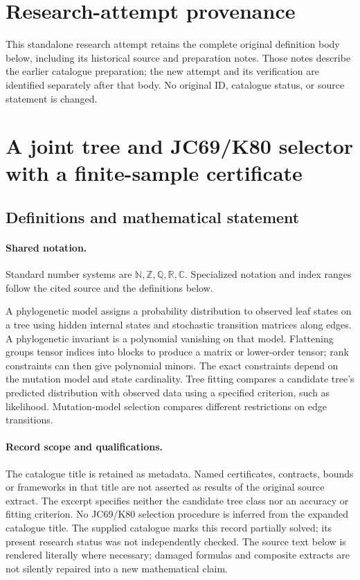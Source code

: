 \documentclass[11pt]{article}
\begin{document}
\section*{Research-attempt provenance}
This standalone research attempt retains the complete original definition body below,
including its historical source and preparation notes. Those notes describe the
earlier catalogue preparation; the new attempt and its verification are identified
separately after that body. No original ID, catalogue status, or source statement is changed.

\section{A joint tree and JC69/K80 selector with a finite-sample certificate}\label{statement}

\subsection{Definitions and mathematical statement}

\paragraph{Shared notation.}Standard number systems are $\mathbb N,\mathbb Z,\mathbb Q,\mathbb R,\mathbb C$. Specialized notation and index ranges follow the cited source and the definitions below.


A phylogenetic model assigns a probability distribution to observed leaf states on a tree using hidden internal states and stochastic transition matrices along edges. A phylogenetic invariant is a polynomial vanishing on that model. Flattening groups tensor indices into blocks to produce a matrix or lower-order tensor; rank constraints can then give polynomial minors. The exact constraints depend on the mutation model and state cardinality. Tree fitting compares a candidate tree's predicted distribution with observed data using a specified criterion, such as likelihood. Mutation-model selection compares different restrictions on edge transitions.
\paragraph{Record scope and qualifications.}
The catalogue title is retained as metadata. Named certificates, contracts, bounds or frameworks in that title are not asserted as results of the original source extract.
The excerpt specifies neither the candidate tree class nor an accuracy or fitting criterion. No JC69/K80 selection procedure is inferred from the expanded catalogue title. The supplied catalogue marks this record partially solved; its present research status was not independently checked.
The source text below is rendered literally where necessary; damaged formulas and composite extracts are not silently repaired into a new mathematical claim.
\end{document}
